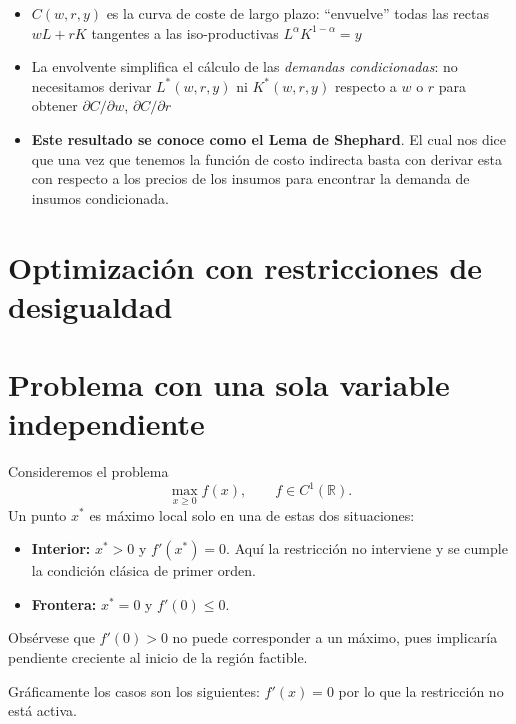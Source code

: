 \documentclass{article}
\begin{document}
\begin{itemize}
  \item \(C(w,r,y)\) es la curva de coste de largo plazo: “envuelve” todas las rectas
    \(wL + rK\) tangentes a las iso-productivas \(L^\alpha K^{1-\alpha}=y\)  
  \item La envolvente simplifica el cálculo de las \emph{demandas condicionadas}: no necesitamos
    derivar \(L^*(w,r,y)\) ni \(K^*(w,r,y)\) respecto a \(w\) o \(r\) para obtener \(\partial C/\partial w\),
    \(\partial C/\partial r\)  
  \item \textbf{\color{teal}Este resultado se conoce como el Lema de Shephard}. El cual nos dice que una vez que tenemos la función de costo indirecta basta con derivar esta con respecto a los precios de los insumos para encontrar la demanda de insumos condicionada.
  \end{itemize}



\newpage
\section{Optimización con restricciones de desigualdad}



\section*{Problema con una sola variable independiente}

Consideremos el problema
\[
\max_{x\ge0}f(x),\qquad f\in C^1(\mathbb{R}).
\]
Un punto \(x^*\) es máximo local solo en una de estas dos situaciones:

\begin{itemize}
  \item \textbf{Interior:} \(x^*>0\) y \(f'(x^*)=0\). Aquí la restricción no interviene y se cumple la condición clásica de primer orden.
  \item \textbf{Frontera:} \(x^*=0\) y \(f'(0)\le0\).  
\end{itemize}

Obsérvese que \(f'(0)>0\) no puede corresponder a un máximo, pues implicaría pendiente creciente al inicio de la región factible.

Gráficamente los casos son los siguientes: $f'(x)=0$ por lo que la restricción no está activa.
\end{document}
